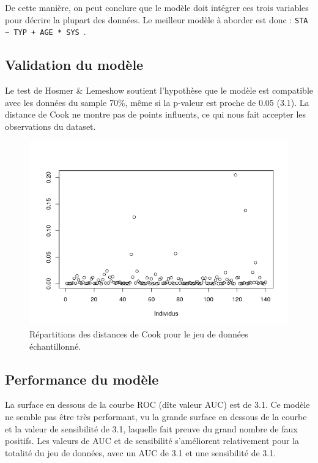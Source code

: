 \documentclass[10pt,a4paper,notitlepage,colorinlistoftodos]{article}
\begin{document}
De cette manière, on peut conclure que le modèle doit intégrer ces trois variables pour décrire la plupart des données. Le meilleur modèle à aborder est donc : \verb|STA ~ TYP + AGE * SYS |.  


\subsection*{Validation du modèle}
Le test de Hosmer \& Lemeshow soutient l'hypothèse que le modèle est compatible avec les données du sample 70\%, même si la p-valeur est proche de 0.05 (3.1). La distance de Cook ne montre pas de points influents, ce qui nous fait accepter les observations du dataset. 

\begin{figure}
\vspace{-20pt}
\begin{center}
\includegraphics{fig/Rplot.png}
\caption{Répartitions des distances de Cook pour le jeu de données échantillonné.}
  \label{table:cooks}
\end{center}
\end{figure}


\subsection*{Performance du modèle}
La surface en dessous de la courbe ROC (dîte valeur AUC) est de 3.1. Ce modèle ne semble pas être très performant, vu la grande surface en dessous de la courbe et la valeur de sensibilité de 3.1, laquelle fait preuve du grand nombre de faux positifs. Les valeurs de AUC et de sensibilité s'améliorent relativement pour la totalité du jeu de données, avec un AUC de 3.1 et une sensibilité de 3.1.  
\end{document}
